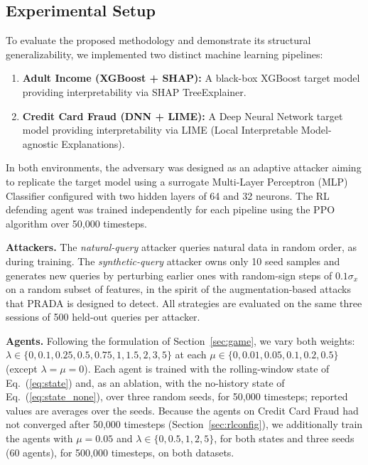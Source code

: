 \documentclass[conference]{IEEEtran}
\DeclareRobustCommand{\rev}[1]{#1}
\DeclareRobustCommand{\revnew}[1]{#1}
\begin{document}
\subsection{Experimental Setup}
\label{sec:setup}
To evaluate the proposed methodology and demonstrate its structural generalizability, we implemented two distinct machine learning pipelines:
\begin{enumerate}
    \item \textbf{Adult Income (XGBoost + SHAP):} A black-box XGBoost target model providing interpretability via SHAP TreeExplainer.
    \item \textbf{Credit Card Fraud (DNN + LIME):} A Deep Neural Network target model providing interpretability via LIME (Local Interpretable Model-agnostic Explanations).
\end{enumerate}

In both environments, the adversary was designed as an adaptive attacker aiming to replicate the target model using a surrogate Multi-Layer Perceptron (MLP) Classifier configured with two hidden layers of 64 and 32 neurons. The RL defending agent was trained independently for each pipeline using the PPO algorithm over 50,000 timesteps.

\rev{\textbf{Attackers.} The \emph{natural-query} attacker queries natural data in random order, as during training. The \emph{synthetic-query} attacker owns only 10 seed samples and generates new queries by perturbing earlier ones with random-sign steps of $0.1\sigma_x$ on a random subset of features, in the spirit of the augmentation-based attacks that PRADA \cite{b17} is designed to detect. All strategies are evaluated on the same three sessions of 500 held-out queries per attacker.}

\rev{\textbf{Agents.} Following the formulation of Section~\ref{sec:game}, we vary both weights: $\lambda \in \{0, 0.1, 0.25, 0.5, 0.75, 1, 1.5, 2, 3, 5\}$ at each $\mu \in \{0, 0.01, 0.05, 0.1, 0.2, 0.5\}$ (except $\lambda=\mu=0$). Each agent is trained with the rolling-window state of Eq.~(\ref{eq:state}) and, as an ablation, with the \revnew{no-history state of Eq.~(\ref{eq:state_none})}, over three random seeds\revnew{, for 50,000 timesteps}; reported values are averages over the seeds. \revnew{Because the agents on Credit Card Fraud had not converged after 50,000 timesteps (Section~\ref{sec:rlconfig}), we additionally train the agents with $\mu=0.05$ and $\lambda \in \{0, 0.5, 1, 2, 5\}$, for both states and three seeds (60 agents), for 500,000 timesteps, on both datasets.}}
\end{document}
